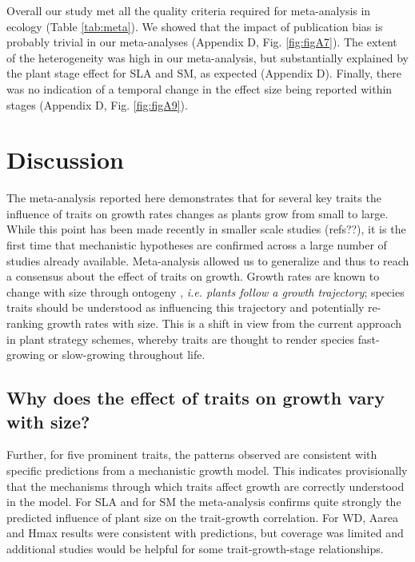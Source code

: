 \documentclass[a4paper,11pt]{article}
\begin{document}
Overall our study met all the quality criteria required for meta-analysis in ecology (Table \ref{tab:meta}). We showed that the impact of publication bias is probably trivial in our meta-analyses (Appendix D, Fig. \ref{fig:figA7}). The extent of the heterogeneity was high in our meta-analysis,  but substantially explained by the plant stage effect for SLA and SM, as expected (Appendix D). Finally, there was no indication of a temporal change in the effect size being reported within stages (Appendix D, Fig. \ref{fig:figA9}).


\section*{Discussion}\label{discussion}

The meta-analysis reported here demonstrates that for several key traits the influence of traits on growth rates changes as plants grow from small to large. While this point has been made recently in smaller scale studies (refs??), it is the first time that mechanistic hypotheses are confirmed across a large number of studies already available. Meta-analysis allowed us to generalize and thus to reach a consensus about the effect of traits on growth. Growth rates are known to change with size through ontogeny \citep{Condit:1993hd, Clark:1999ed, Herault:2011dd}, \textit{i.e. plants follow a growth trajectory}; species traits should be understood as influencing this trajectory and potentially re-ranking growth rates with size. This is a shift in view from the current approach in plant strategy schemes, whereby traits are thought to render species fast-growing or slow-growing throughout life.

\subsection*{Why does the effect of traits on growth vary with size?}

Further, for five prominent traits, the patterns observed are consistent with specific predictions from a mechanistic growth model. This indicates provisionally that the mechanisms through which traits affect growth are correctly understood in the model. For SLA and for SM the meta-analysis confirms quite strongly the predicted influence of plant size on the trait-growth correlation. For WD, Aarea and Hmax results were consistent with predictions, but coverage was limited and additional studies would be helpful for some trait-growth-stage relationships.
\end{document}
